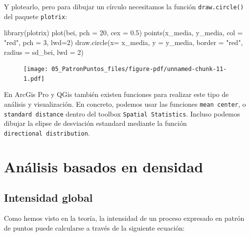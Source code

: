 \documentclass[
  letterpaper,
  DIV=11,
  numbers=noendperiod]{scrreprt}
\newenvironment{Shaded}{\begin{snugshade}}{\end{snugshade}}
\newcommand{\AttributeTok}[1]{\textcolor[rgb]{0.40,0.45,0.13}{#1}}
\newcommand{\DecValTok}[1]{\textcolor[rgb]{0.68,0.00,0.00}{#1}}
\newcommand{\FloatTok}[1]{\textcolor[rgb]{0.68,0.00,0.00}{#1}}
\newcommand{\FunctionTok}[1]{\textcolor[rgb]{0.28,0.35,0.67}{#1}}
\newcommand{\NormalTok}[1]{\textcolor[rgb]{0.00,0.23,0.31}{#1}}
\newcommand{\StringTok}[1]{\textcolor[rgb]{0.13,0.47,0.30}{#1}}
\begin{document}
Y plotearlo, pero para dibujar un círculo necesitamos la función
\texttt{draw.circle()} del paquete \texttt{plotrix}:

\begin{Shaded}
\begin{Highlighting}[]
\FunctionTok{library}\NormalTok{(plotrix)}
\FunctionTok{plot}\NormalTok{(bei, }\AttributeTok{pch =} \DecValTok{20}\NormalTok{, }\AttributeTok{cex =} \FloatTok{0.5}\NormalTok{)}
\FunctionTok{points}\NormalTok{(x\_media, y\_media, }\AttributeTok{col =} \StringTok{"red"}\NormalTok{, }\AttributeTok{pch =} \DecValTok{3}\NormalTok{, }\AttributeTok{lwd=}\DecValTok{2}\NormalTok{)}
\FunctionTok{draw.circle}\NormalTok{(}\AttributeTok{x=}\NormalTok{ x\_media, }\AttributeTok{y =}\NormalTok{ y\_media, }\AttributeTok{border =} \StringTok{"red"}\NormalTok{, }
            \AttributeTok{radius =}\NormalTok{ sd\_bei, }\AttributeTok{lwd =} \DecValTok{2}\NormalTok{)}
\end{Highlighting}
\end{Shaded}

\begin{figure}[H]

{\centering \texttt{[image: 05\_PatronPuntos\_files/figure-pdf/unnamed-chunk-11-1.pdf]}

}

\end{figure}

En ArcGis Pro y QGis también existen funciones para realizar este tipo
de análisis y visualización. En concreto, podemos usar las funciones
\texttt{mean\ center}, o \texttt{standard\ distance} dentro del toolbox
\texttt{Spatial\ Statistics}. Incluso podemos dibujar la elipse de
desviación estandard mediante la función
\texttt{directional\ distribution}.

\hypertarget{anuxe1lisis-basados-en-densidad}{%
\section{Análisis basados en
densidad}\label{anuxe1lisis-basados-en-densidad}}

\hypertarget{intensidad-global}{%
\subsection{Intensidad global}\label{intensidad-global}}

Como hemos visto en la teoría, la intensidad de un proceso expresado en
patrón de puntos puede calcularse a través de la siguiente ecuación:
\end{document}
